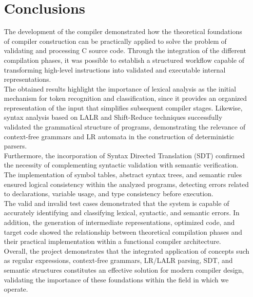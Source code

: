 \documentclass[letterpaper,12pt,oneside]{article}
\begin{document}
\section{Conclusions}
The development of the compiler demonstrated how the theoretical foundations of compiler construction can be practically applied to solve the problem of validating and processing C source code. Through the integration of the different compilation phases, it was possible to establish a structured workflow capable of transforming high-level instructions into validated and executable internal representations.
\\
The obtained results highlight the importance of lexical analysis as the initial mechanism for token recognition and classification, since it provides an organized representation of the input that simplifies subsequent compiler stages. Likewise, syntax analysis based on LALR and Shift-Reduce techniques successfully validated the grammatical structure of programs, demonstrating the relevance of context-free grammars and LR automata in the construction of deterministic parsers.
\\
Furthermore, the incorporation of Syntax Directed Translation (SDT) confirmed the necessity of complementing syntactic validation with semantic verification. The implementation of symbol tables, abstract syntax trees, and semantic rules ensured logical consistency within the analyzed programs, detecting errors related to declarations, variable usage, and type consistency before execution.
\\
The valid and invalid test cases demonstrated that the system is capable of accurately identifying and classifying lexical, syntactic, and semantic errors. In addition, the generation of intermediate representations, optimized code, and target code showed the relationship between theoretical compilation phases and their practical implementation within a functional compiler architecture.
\\
Overall, the project demonstrates that the integrated application of concepts such as regular expressions, context-free grammars, LR/LALR parsing, SDT, and semantic structures constitutes an effective solution for modern compiler design, validating the importance of these foundations within the field in which we operate.
\printbibliography
\end{document}
